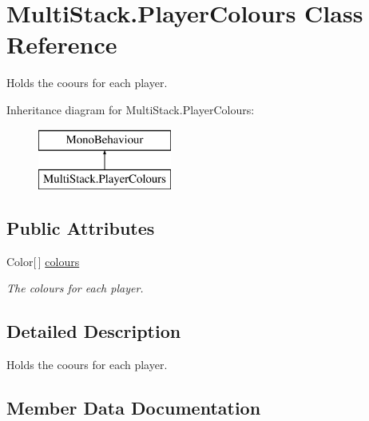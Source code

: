 \hypertarget{class_multi_stack_1_1_player_colours}{}\section{Multi\+Stack.\+Player\+Colours Class Reference}
\label{class_multi_stack_1_1_player_colours}


Holds the coours for each player.  


Inheritance diagram for Multi\+Stack.\+Player\+Colours\+:\begin{figure}[H]
\begin{center}
\leavevmode
\includegraphics[height=2.000000cm]{class_multi_stack_1_1_player_colours}
\end{center}
\end{figure}
\subsection*{Public Attributes}
\begin{DoxyCompactItemize}
\item 
Color\mbox{[}$\,$\mbox{]} \hyperlink{class_multi_stack_1_1_player_colours_a3fdd21deb5bab6b7005ed9e72e2053a7}{colours}
\begin{DoxyCompactList}\small\item\em The colours for each player. \end{DoxyCompactList}\end{DoxyCompactItemize}


\subsection{Detailed Description}
Holds the coours for each player. 



\subsection{Member Data Documentation}
\hypertarget{class_multi_stack_1_1_player_colours_a3fdd21deb5bab6b7005ed9e72e2053a7}{}
